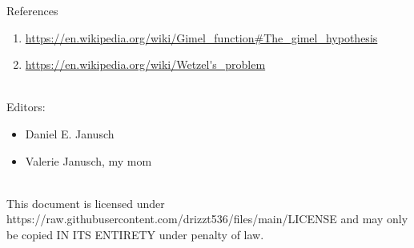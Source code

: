 \documentclass[12pt]{article}
\begin{document}
\begin{section}{References}
\begin{enumerate}
		\item\url{https://en.wikipedia.org/wiki/Gimel\_function\#The\_gimel\_hypothesis}\\
		\label{ref:gimel}

		\item\url{https://en.wikipedia.org/wiki/Wetzel's\_problem}\\
		\label{ref:wetzel}
	\end{enumerate}\\
	Editors:
	\begin{itemize}
		\item Daniel E. Janusch
		\item Valerie Janusch, my mom
	\end{itemize}
	\vspace{3em}\\
	This document is licensed under https://raw.githubusercontent.com/drizzt536/files/main/LICENSE
	and may only be copied IN ITS ENTIRETY under penalty of law.
\end{section}
\end{document}
